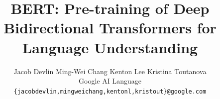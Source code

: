 \documentclass[11pt,a4paper]{article}
\title{\textbf{BERT}: Pre-training of Deep Bidirectional Transformers for \\ Language Understanding}
\author{Jacob Devlin \quad Ming-Wei Chang \quad Kenton Lee \quad Kristina Toutanova \\
  Google AI Language \\
  {\tt \{jacobdevlin,mingweichang,kentonl,kristout\}@google.com} \\}
\date{}
\begin{document}
\maketitle
\begin{abstract}
  
\end{abstract}















\end{document}
